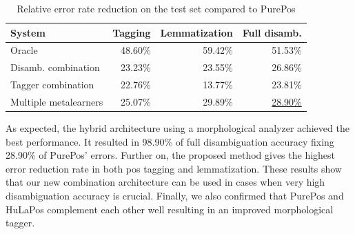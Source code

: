 \begin{table}[h]
\centering
\caption{Relative error rate reduction on the test set compared to PurePos}\label{tab:comb-eval}
\begin{tabular}{l r r r}
\hline
System & Tagging & Lemmatization & Full disamb. \\
\hline
Oracle & 48.60\% & 59.42\% & 51.53\% \\
Disamb. combination & 23.23\% & 23.55\% & 26.86\% \\
Tagger combination & 22.76\% & 13.77\% & 23.81\% \\
Multiple metalearners & 25.07\% & 29.89\% & \underline{28.90\%} \\
\hline
\end{tabular}
\end{table}

As expected, the hybrid architecture using a morphological analyzer achieved the best performance.
It resulted in 98.90\% of full disambiguation accuracy fixing 28.90\% of PurePos’ errors.
Further on, the proposed method gives the highest error reduction rate in both \acrshort{pos} tagging and lemmatization.
These results show that our new combination architecture can be used in cases when very high disambiguation accuracy is crucial.
Finally, we also confirmed that PurePos and HuLaPos complement each other well resulting in an improved morphological tagger. 



 

 

 

 
